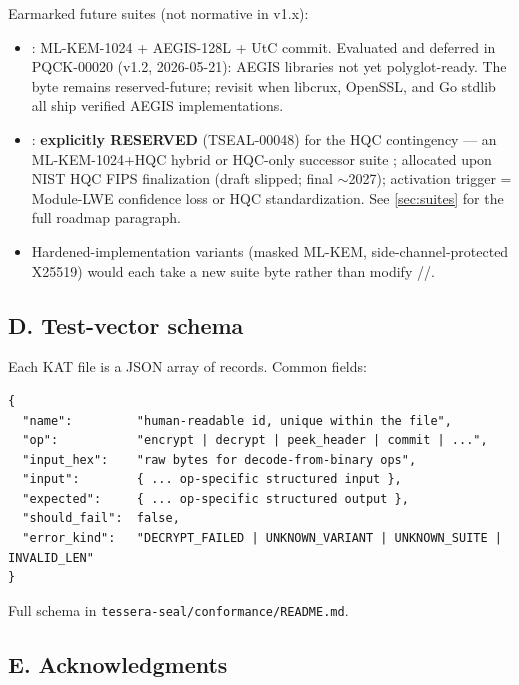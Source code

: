 Earmarked future suites (not normative in v1.x):
\begin{itemize}
\item {}: ML-KEM-1024 + AEGIS-128L + UtC commit. Evaluated and deferred in PQCK-00020 (v1.2, 2026-05-21): AEGIS libraries not yet polyglot-ready. The byte remains reserved-future; revisit when libcrux, OpenSSL, and Go stdlib all ship verified AEGIS implementations.
\item {}: \textbf{explicitly RESERVED} (TSEAL-00048) for the HQC contingency --- an ML-KEM-1024+HQC hybrid or HQC-only successor suite \citep{nisthqc2025}; allocated upon NIST HQC FIPS finalization (draft slipped; final $\sim$2027); activation trigger = Module-LWE confidence loss or HQC standardization. See \cref{sec:suites} for the full roadmap paragraph.
\item Hardened-implementation variants (masked ML-KEM, side-channel-protected X25519) would each take a new suite byte rather than modify //.
\end{itemize}

\subsection*{D. Test-vector schema}

Each KAT file is a JSON array of records. Common fields:

\begin{lstlisting}[language=Pseudocode]
{
  "name":         "human-readable id, unique within the file",
  "op":           "encrypt | decrypt | peek_header | commit | ...",
  "input_hex":    "raw bytes for decode-from-binary ops",
  "input":        { ... op-specific structured input },
  "expected":     { ... op-specific structured output },
  "should_fail":  false,
  "error_kind":   "DECRYPT_FAILED | UNKNOWN_VARIANT | UNKNOWN_SUITE | INVALID_LEN"
}
\end{lstlisting}

Full schema in \texttt{tessera-seal/conformance/README.md}.

\subsection*{E. Acknowledgments}

